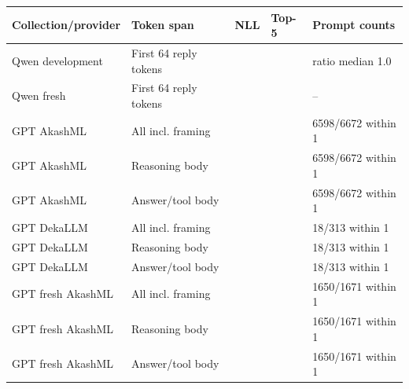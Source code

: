 \begin{tabular}{lllll}
\toprule
Collection/provider & Token span & NLL & Top-5 & Prompt counts \\
\midrule
Qwen development & First 64 reply tokens & \qwenReplayNLL{} & \qwenReplayTop{} & ratio median 1.0 \\
Qwen fresh & First 64 reply tokens & \qwenFreshReplayNLL{} & \qwenFreshReplayTop{} & -- \\
GPT AkashML & All incl. framing & \gptReplayAkashMLAllNLL{} & \gptReplayAkashMLAllTop{} & 6598/6672 within 1 \\
GPT AkashML & Reasoning body & \gptReplayAkashMLReasoningNLL{} & \gptReplayAkashMLReasoningTop{} & 6598/6672 within 1 \\
GPT AkashML & Answer/tool body & \gptReplayAkashMLAnswerNLL{} & \gptReplayAkashMLAnswerTop{} & 6598/6672 within 1 \\
GPT DekaLLM & All incl. framing & \gptReplayDekaLLMAllNLL{} & \gptReplayDekaLLMAllTop{} & 18/313 within 1 \\
GPT DekaLLM & Reasoning body & \gptReplayDekaLLMReasoningNLL{} & \gptReplayDekaLLMReasoningTop{} & 18/313 within 1 \\
GPT DekaLLM & Answer/tool body & \gptReplayDekaLLMAnswerNLL{} & \gptReplayDekaLLMAnswerTop{} & 18/313 within 1 \\
GPT fresh AkashML & All incl. framing & \gptFreshReplayAllNLL{} & \gptFreshReplayAllTop{} & 1650/1671 within 1 \\
GPT fresh AkashML & Reasoning body & \gptFreshReplayReasoningNLL{} & \gptFreshReplayReasoningTop{} & 1650/1671 within 1 \\
GPT fresh AkashML & Answer/tool body & \gptFreshReplayAnswerNLL{} & \gptFreshReplayAnswerTop{} & 1650/1671 within 1 \\
\bottomrule
\end{tabular}
